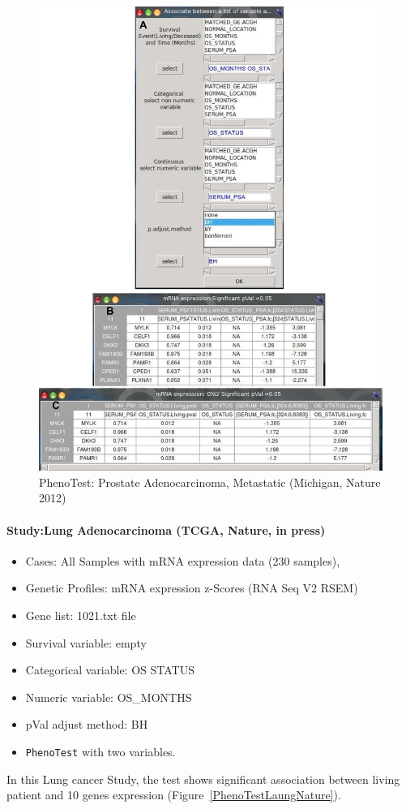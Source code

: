 \documentclass[a4paper]{article}
\begin{document}
\begin{figure}[!ht]
 \centering
\includegraphics[scale=0.8]{image/prad_MichiganResults.png}
\caption{PhenoTest: Prostate Adenocarcinoma, Metastatic (Michigan, Nature 2012)}
\label{PhenoTestprad_Michigan}
\end{figure}



\paragraph{Study:Lung Adenocarcinoma (TCGA, Nature, in press)} 
\begin{itemize}
    \item Cases: All Samples with mRNA expression data (230 samples),
    \item Genetic Profiles: mRNA expression z-Scores (RNA Seq V2 RSEM)
    \item Gene list: 1021.txt file
    \item Survival variable: empty
    \item Categorical variable: OS STATUS
    \item Numeric variable: OS\_MONTHS
    \item pVal adjust method: BH
    \item \texttt{PhenoTest} with two variables.
\end{itemize}
In this Lung cancer Study, the test shows significant association between living patient and 10 genes expression (Figure~\ref{PhenoTestLaungNature}).
\end{document}
